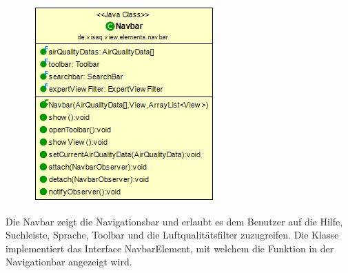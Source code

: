 \begin{minipage}{0.3\textwidth}
    \begin{figure}[H]
        \includegraphics[scale = 0.5]{media/frontend/view/de.view.elements.navbar/NavbarClass.png}
    \end{figure}
    \end{minipage} \hfill
    \begin{minipage}{0.6\textwidth}
Die Navbar zeigt die Navigationsbar und erlaubt es dem Benutzer auf die Hilfe, Suchleiste, Sprache, Toolbar und die Luftqualitätsfilter zuzugreifen.  Die Klasse implementiert das Interface NavbarElement, mit welchem die Funktion in der Navigationbar angezeigt wird.
\end{minipage}

